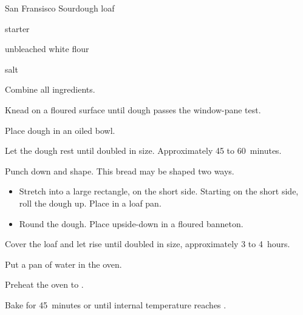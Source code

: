 \begin{recipe}{San Fransisco Sourdough}{}{\kgr{\half} loaf}

\begin{ingredients}
\item \C{1\threequarter} starter
\item {} unbleached white flour
\item {} salt
\end{ingredients}

\begin{directions}
\item Combine all ingredients.
\item Knead on a floured surface until dough passes the window-pane test.
\item Place dough in an oiled bowl.
\item Let the dough rest until doubled in size. Approximately 45 to 60~minutes.
\item Punch down and shape.
This bread may be shaped two ways.
\begin{itemize}
\item Stretch into a large rectangle,  on the short side. Starting on the short side, roll the dough up. Place in a loaf pan.
\item Round the dough. Place upside-down in a floured banneton.
\end{itemize}
\item Cover the loaf and let rise until doubled in size, approximately 3 to 4~hours.
\item Put a pan of water in the oven.
\item Preheat the oven to .
\item Bake for 45~minutes or until internal temperature reaches .
\end{directions}
\end{recipe}
